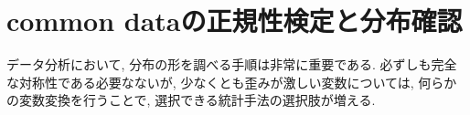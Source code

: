 %
%
%
%
%
%
%
%
%
%
%
%
%
%
%




\chapter{common dataの正規性検定と分布確認}

データ分析において, 分布の形を調べる手順は非常に重要である.
必ずしも完全な対称性である必要なないが, 少なくとも歪みが激しい変数については,
何らかの変数変換を行うことで,
選択できる統計手法の選択肢が増える.

